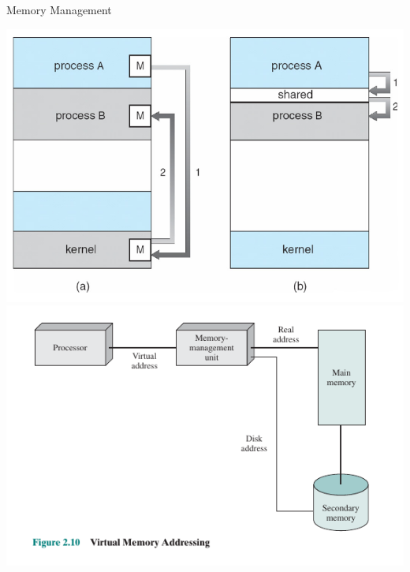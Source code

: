 \documentclass[10pt]{beamer}
\begin{document}
\begin{frame}[allowframebreaks]{Memory Management}
  \begin{center}
  \includegraphics[keepaspectratio, width=\textwidth, height=\textheight-2\baselineskip-2\baselineskip]{img/012_mem_map.png} \\ \framebreak
    \includegraphics[keepaspectratio, width=\textwidth, height=\textheight-2\baselineskip-2\baselineskip]{img/012_mmu.png} \\ \framebreak

\end{center}
\end{frame}
\end{document}
